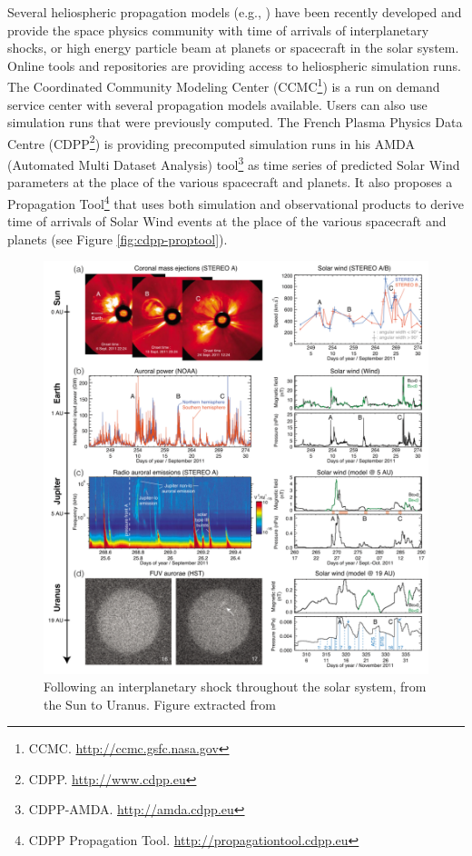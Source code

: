 \documentclass[referee,a4paper,12pt,traditabstract]{swsc}
\begin{document}
\begin{linenumbers}
Several heliospheric propagation models (e.g., \cite{Tao05,zieger08}) have been recently developed and provide the space physics community with time of arrivals of interplanetary shocks, or high energy particle beam at planets or spacecraft in the solar system. Online tools and repositories are providing access to heliospheric simulation runs. The Coordinated Community Modeling Center (CCMC\footnote{CCMC. \url{http://ccmc.gsfc.nasa.gov}}) is a run on demand service center with several propagation models available. Users can also use simulation runs that were previously computed. The French Plasma Physics Data Centre (CDPP\footnote{CDPP. \url{http://www.cdpp.eu}}) is providing precomputed simulation runs in his AMDA (Automated Multi Dataset Analysis) tool\footnote{CDPP-AMDA. \url{http://amda.cdpp.eu}} as time series of predicted Solar Wind parameters at the place of the various spacecraft and planets. It also proposes a Propagation Tool\footnote{CDPP Propagation Tool. \url{http://propagationtool.cdpp.eu}} that uses both simulation and observational products to derive time of arrivals of Solar Wind events at the place of the various spacecraft and planets (see Figure \ref{fig:cdpp-proptool}).

\begin{figure}
\centering\includegraphics[width=\linewidth]{pasted-image-1213.png}
\caption{Following an interplanetary shock throughout the solar system, from the Sun to Uranus. Figure extracted from \cite{Lamy12}}
\label{fig:ips-uranus}
\end{figure}



\end{linenumbers}
\end{document}
